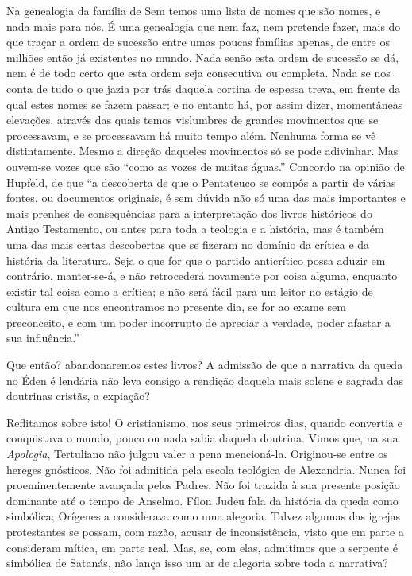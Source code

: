\documentclass[11pt,a5paper,twoside,openany]{book}
\begin{document}
Na genealogia da família de Sem temos uma lista de nomes que são nomes, e nada mais para nós. É uma genealogia que nem faz, nem pretende fazer, mais do que traçar a ordem de sucessão entre umas poucas famílias apenas, de entre os milhões então já existentes no mundo. Nada senão esta ordem de sucessão se dá, nem é de todo certo que esta ordem seja consecutiva ou completa. Nada se nos conta de tudo o que jazia por trás daquela cortina de espessa treva, em frente da qual estes nomes se fazem passar; e no entanto há, por assim dizer, momentâneas elevações, através das quais temos vislumbres de grandes movimentos que se processavam, e se processavam há muito tempo além. Nenhuma forma se vê distintamente. Mesmo a direção daqueles movimentos só se pode adivinhar. Mas ouvem-se vozes que são “como as vozes de muitas águas.” Concordo na opinião de Hupfeld, de que “a descoberta de que o Pentateuco se compôs a partir de várias fontes, ou documentos originais, é sem dúvida não só uma das mais importantes e mais prenhes de consequências para a interpretação dos livros históricos do Antigo Testamento, ou antes para toda a teologia e a história, mas é também uma das mais certas descobertas que se fizeram no domínio da crítica e da história da literatura. Seja o que for que o partido anticrítico possa aduzir em contrário, manter-se-á, e não retrocederá novamente por coisa alguma, enquanto existir tal coisa como a crítica; e não será fácil para um leitor no estágio de cultura em que nos encontramos no presente dia, se for ao exame sem preconceito, e com um poder incorrupto de apreciar a verdade, poder afastar a sua influência.”

Que então? abandonaremos estes livros? A admissão de que a narrativa da queda no Éden é lendária não leva consigo a rendição daquela mais solene e sagrada das doutrinas cristãs, a expiação?

Reflitamos sobre isto! O cristianismo, nos seus primeiros dias, quando convertia e conquistava o mundo, pouco ou nada sabia daquela doutrina. Vimos que, na sua \textit{Apologia}, Tertuliano não julgou valer a pena mencioná-la. Originou-se entre os hereges gnósticos. Não foi admitida pela escola teológica de Alexandria. Nunca foi proeminentemente avançada pelos Padres. Não foi trazida à sua presente posição dominante até o tempo de Anselmo. Fílon Judeu fala da história da queda como simbólica; Orígenes a considerava como uma alegoria. Talvez algumas das igrejas protestantes se possam, com razão, acusar de inconsistência, visto que em parte a consideram mítica, em parte real. Mas, se, com elas, admitimos que a serpente é simbólica de Satanás, não lança isso um ar de alegoria sobre toda a narrativa?
\end{document}
